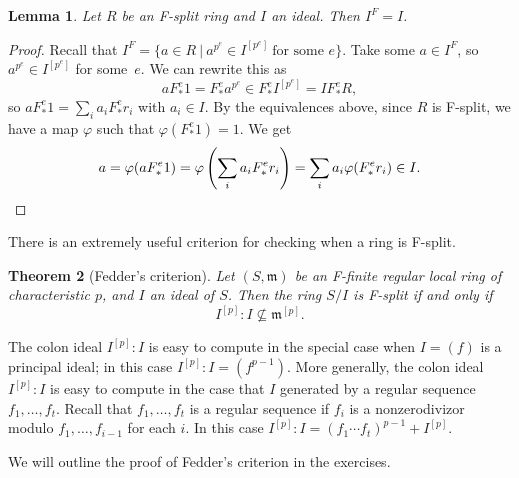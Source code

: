 \documentclass[12pt]{amsart}
\newtheorem{theorem}{Theorem}[section]
\newtheorem{lemma}[theorem]{Lemma}
\theoremstyle{definition}
\numberwithin{equation}{theorem}
\def\frakm{\mathfrak{m}}
\def\phi{\varphi}
\begin{document}
\begin{lemma} Let $R$ be an F-split ring and $I$ an ideal. Then $I^F = I$.
\end{lemma}
\begin{proof} Recall that $I^F=\{ a\in R \ | \ a^{p^e}\in I^{[p^e]} \ \text{for some $e$}\}$. Take some $a\in I^F$, so $a^{p^e}\in I^{[p^e]}$ for some~$e$. We can rewrite this as
\[ a F^e_* 1  = F^e_* a^{p^e} \in F^e_* I^{[p^e]} = I F^e_* R,\]
so $a F^e_* 1 = \sum_i a_i F^e_* r_i$ with $a_i\in I$. By the equivalences above, since $R$ is F-split, we have a map $\phi$ such that $\phi(F^e_*1) = 1$. We get
\[ a = \phi(a F^e_* 1) = \phi\left( \sum_i a_i F^e_* r_i \right) = \sum_i a_i \phi( F^e_* r_i ) \in I. \qedhere\]
\end{proof}

There is an extremely useful criterion for checking when a ring is F-split.

\begin{theorem}[Fedder's criterion]
Let $(S,\frakm)$ be an F-finite regular local ring of characteristic $p$, and $I$ an ideal of $S$. Then the ring $S/I$ is F-split if and only if 
\[ I^{[p]}: I \not\subseteq \frakm^{[p]}.\]
\end{theorem}

The colon ideal $I^{[p]}: I$ is easy to compute in the special case when $I=(f)$ is a principal ideal; in this case $I^{[p]}: I = (f^{p-1})$.
More generally, the colon ideal $I^{[p]}: I$ is easy to compute in the case that $I$ generated by a regular sequence $f_1,\dots,f_t$. Recall that $f_1,\dots,f_t$ is a regular sequence if $f_i$ is a nonzerodivizor modulo $f_1,\dots,f_{i-1}$ for each $i$. In this case $I^{[p]}: I =(f_1 \cdots f_t)^{p-1}+I^{[p]}$.

We will outline the proof of Fedder's criterion in the exercises.
\end{document}
